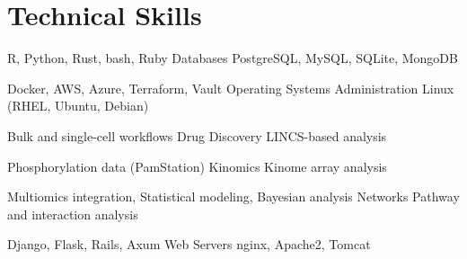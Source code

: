 \section{Technical Skills}

{R, Python, Rust, bash, Ruby}
{Databases}
{PostgreSQL, MySQL, SQLite, MongoDB}

{Docker, AWS, Azure, Terraform, Vault}
{Operating Systems Administration}
{Linux (RHEL, Ubuntu, Debian)}

{Bulk and single-cell workflows}
{Drug Discovery}
{LINCS-based analysis}

{Phosphorylation data (PamStation)}
{Kinomics}
{Kinome array analysis}

{Multiomics integration, Statistical modeling, Bayesian analysis}
{Networks}
{Pathway and interaction analysis}

{Django, Flask, Rails, Axum}
{Web Servers}
{nginx, Apache2, Tomcat}
